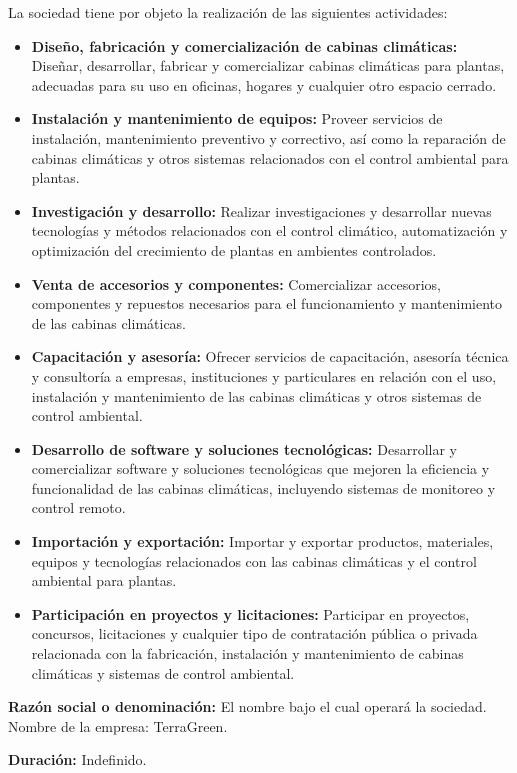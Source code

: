La sociedad tiene por objeto la realización de las siguientes actividades:
\begin{itemize}
    \item \textbf{Diseño, fabricación y comercialización de cabinas climáticas:} Diseñar, desarrollar, fabricar y comercializar cabinas climáticas para plantas, adecuadas para su uso en oficinas, hogares y cualquier otro espacio cerrado.
    \item \textbf{Instalación y mantenimiento de equipos:} Proveer servicios de instalación, mantenimiento preventivo y correctivo, así como la reparación de cabinas climáticas y otros sistemas relacionados con el control ambiental para plantas.
    \item \textbf{Investigación y desarrollo:} Realizar investigaciones y desarrollar nuevas tecnologías y métodos relacionados con el control climático, automatización y optimización del crecimiento de plantas en ambientes controlados.
    \item \textbf{Venta de accesorios y componentes:} Comercializar accesorios, componentes y repuestos necesarios para el funcionamiento y mantenimiento de las cabinas climáticas.
    \item \textbf{Capacitación y asesoría:} Ofrecer servicios de capacitación, asesoría técnica y consultoría a empresas, instituciones y particulares en relación con el uso, instalación y mantenimiento de las cabinas climáticas y otros sistemas de control ambiental.
    \item \textbf{Desarrollo de software y soluciones tecnológicas:} Desarrollar y comercializar software y soluciones tecnológicas que mejoren la eficiencia y funcionalidad de las cabinas climáticas, incluyendo sistemas de monitoreo y control remoto.
    \item \textbf{Importación y exportación:} Importar y exportar productos, materiales, equipos y tecnologías relacionados con las cabinas climáticas y el control ambiental para plantas.
    \item \textbf{Participación en proyectos y licitaciones:} Participar en proyectos, concursos, licitaciones y cualquier tipo de contratación pública o privada relacionada con la fabricación, instalación y mantenimiento de cabinas climáticas y sistemas de control ambiental.
\end{itemize}

\textbf{Razón social o denominación:}
El nombre bajo el cual operará la sociedad.
Nombre de la empresa: TerraGreen.

\textbf{Duración:}
Indefinido.


